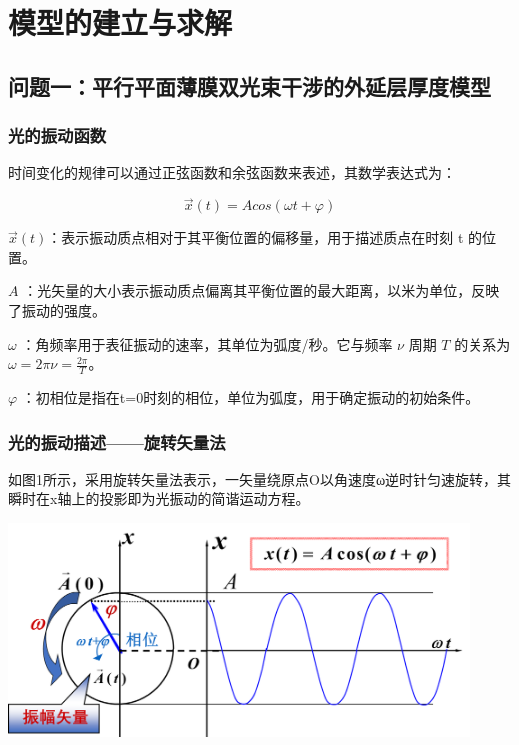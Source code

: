 \documentclass[
]{article}
\author{}
\date{}
\begin{document}
\hypertarget{ux6a21ux578bux7684ux5efaux7acbux4e0eux6c42ux89e3}{%
\section{模型的建立与求解}\label{ux6a21ux578bux7684ux5efaux7acbux4e0eux6c42ux89e3}}

\hypertarget{ux95eeux9898ux4e00ux5e73ux884cux5e73ux9762ux8584ux819cux53ccux5149ux675fux5e72ux6d89ux7684ux5916ux5ef6ux5c42ux539aux5ea6ux6a21ux578b}{%
\subsection{问题一：平行平面薄膜双光束干涉的外延层厚度模型}\label{ux95eeux9898ux4e00ux5e73ux884cux5e73ux9762ux8584ux819cux53ccux5149ux675fux5e72ux6d89ux7684ux5916ux5ef6ux5c42ux539aux5ea6ux6a21ux578b}}

\hypertarget{ux5149ux7684ux632fux52a8ux51fdux6570}{%
\subsubsection{光的振动函数}\label{ux5149ux7684ux632fux52a8ux51fdux6570}}

时间变化的规律可以通过正弦函数和余弦函数来表述，其数学表达式为：

\[\overrightarrow{x}(t) = Acos(\omega t + \varphi)\]

\(\overrightarrow{x}(t)\)：表示振动质点相对于其平衡位置的偏移量，用于描述质点在时刻
t 的位置。

\(A\)
：光矢量的大小表示振动质点偏离其平衡位置的最大距离，以米为单位，反映了振动的强度。

\(\omega\) ：角频率用于表征振动的速率，其单位为弧度/秒。它与频率 \(\nu\)
周期 \(T\) 的关系为 \(\omega = 2\pi\nu = \frac{2\pi}{T}\)。

\(\varphi\)
：初相位是指在t=0时刻的相位，单位为弧度，用于确定振动的初始条件。

\hypertarget{ux5149ux7684ux632fux52a8ux63cfux8ff0ux65cbux8f6cux77e2ux91cfux6cd5}{%
\subsubsection{光的振动描述------旋转矢量法}\label{ux5149ux7684ux632fux52a8ux63cfux8ff0ux65cbux8f6cux77e2ux91cfux6cd5}}

如图1所示，采用旋转矢量法表示，一矢量绕原点O以角速度ω逆时针匀速旋转，其瞬时在x轴上的投影即为光振动的简谐运动方程。

\includegraphics[width=4.81111in,height=2.23194in]{vertopal_72c3f5a01d1e42e3b032effc6533cf2c/media/image1.png}
\end{document}
